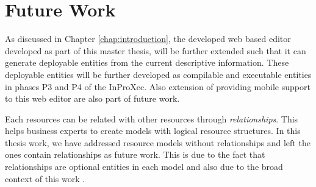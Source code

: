 \section*{Future Work}
\label{sec:futurework}
As discussed in Chapter \ref{chap:introduction}, the developed web based editor developed as part of this master thesis, will be further extended such that it can generate deployable entities from the current descriptive information. These deployable entities will be further developed as compilable and executable entities in phases P3 and P4 of the InProXec\cite{Sungur2015}. Also extension of providing mobile support to this web editor are also part of future work. 

Each resources can be related with other resources through \textit{relationships}. This helps business experts to create models with logical resource structures. In this thesis work, we have addressed resource models without relationships and left the ones contain relationships as future work. This is due to the fact that relationships are optional entities in each model and also due to the broad context of this work \cite{Sungur2014a}. 



